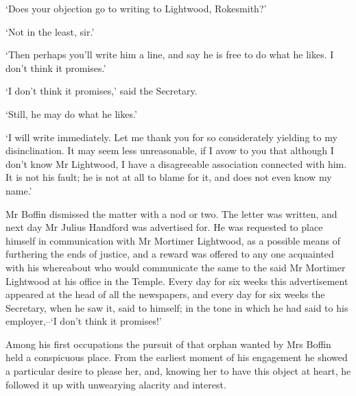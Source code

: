 ‘Does your objection go to writing to Lightwood, Rokesmith?’

‘Not in the least, sir.’

‘Then perhaps you’ll write him a line, and say he is free to do what he
likes. I don’t think it promises.’

‘I don’t think it promises,’ said the Secretary.

‘Still, he may do what he likes.’

‘I will write immediately. Let me thank you for so considerately
yielding to my disinclination. It may seem less unreasonable, if I avow
to you that although I don’t know Mr Lightwood, I have a disagreeable
association connected with him. It is not his fault; he is not at all to
blame for it, and does not even know my name.’

Mr Boffin dismissed the matter with a nod or two. The letter was
written, and next day Mr Julius Handford was advertised for. He was
requested to place himself in communication with Mr Mortimer Lightwood,
as a possible means of furthering the ends of justice, and a reward was
offered to any one acquainted with his whereabout who would communicate
the same to the said Mr Mortimer Lightwood at his office in the Temple.
Every day for six weeks this advertisement appeared at the head of all
the newspapers, and every day for six weeks the Secretary, when he
saw it, said to himself; in the tone in which he had said to his
employer,--‘I don’t think it promises!’

Among his first occupations the pursuit of that orphan wanted by
Mrs Boffin held a conspicuous place. From the earliest moment of his
engagement he showed a particular desire to please her, and, knowing her
to have this object at heart, he followed it up with unwearying alacrity
and interest.


